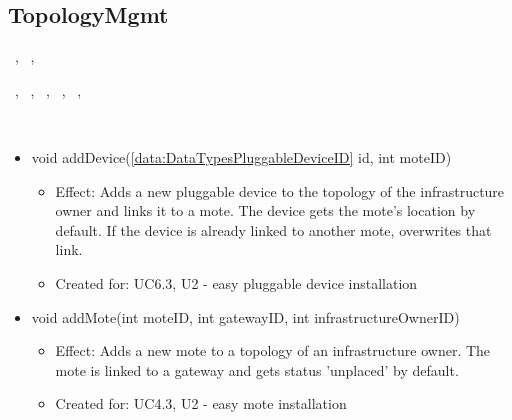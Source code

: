   \subsection{TopologyMgmt}\label{int:OnlineServiceOnlineServiceTopologyManagerTopologyMgmt}
    \begin{description}
      \item[Provided by:] \iconcomponent{}~, \iconcomponent{}~, \iconcomponent{}~
      \item[Required by:] \iconcomponent{}~, \iconcomponent{}~, \iconcomponent{}~, \iconcomponent{}~, \iconcomponent{}~, \iconcomponent{}~
      \item[Operations:] ~
    \begin{itemize}[noitemsep,nolistsep,leftmargin=-.25cm]
      \item \textsf{void addDevice(\ref{data:DataTypesPluggableDeviceID} id, int moteID)}
        \begin{itemize}[noitemsep,nolistsep]
           \item Effect: Adds a new pluggable device to the topology of the infrastructure owner and links it to a mote. The device gets the mote's location by default. If the device is already linked to another mote, overwrites that link.
\item Created for: UC6.3, U2 - easy pluggable device installation
        \end{itemize}
      \item \textsf{void addMote(int moteID, int gatewayID, int infrastructureOwnerID)}
        \begin{itemize}[noitemsep,nolistsep]
           \item Effect: Adds a new mote to a topology of an infrastructure owner. The mote is linked to a gateway and gets status 'unplaced' by default.
\item Created for: UC4.3, U2 - easy mote installation
        \end{itemize}

\end{itemize}
\end{description}
